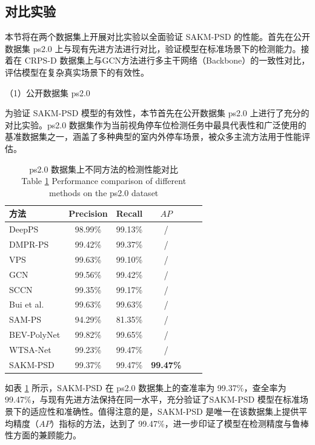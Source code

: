 \subsection{对比实验}

本节将在两个数据集上开展对比实验以全面验证 SAKM-PSD 的性能。首先在公开数据集 ps2.0 上与现有先进方法进行对比，验证模型在标准场景下的检测能力。接着在 CRPS-D 数据集上与GCN\cite{min2021attentional}方法进行多主干网络（Backbone）的一致性对比，评估模型在复杂真实场景下的有效性。

（1）公开数据集 ps2.0

为验证 SAKM-PSD 模型的有效性，本节首先在公开数据集 ps2.0 上进行了充分的对比实验。ps2.0 数据集作为当前视角停车位检测任务中最具代表性和广泛使用的基准数据集之一，涵盖了多种典型的室内外停车场景，被众多主流方法用于性能评估。

\begin{table}[!ht]
\centering
\setlength{\tabcolsep}{8mm}
\caption{ps2.0 数据集上不同方法的检测性能对比 \\ Table \ref{tab_2ps2} Performance comparison of different methods on the ps2.0 dataset}
\begin{tabular}{lccccc}
\toprule
    方法 &  Precision & Recall &  $AP$\\
\midrule
       DeepPS\cite{zhang2018vision}  &  98.99\% & 99.13\% & / \\
       DMPR-PS\cite{huang2019dmpr} &  99.42\% & 99.37\% & / \\
       VPS\cite{li2020vacant}  &  99.63\% & 99.10\% & / \\
       GCN\cite{min2021attentional}  &  99.56\% & 99.42\% & /\\
       SCCN \cite{zheng2022center}  &  99.35\% & 99.17\% & / \\
       Bui et al.\cite{bui2023one} &   99.63\% & 99.63\% & / \\
       SAM-PS\cite{zhai2024sam} &  94.29\% & 81.35\% & / \\
       BEV-PolyNet\cite{duan2025bev}  &  99.82\% & 99.65\% & / \\
       WTSA-Net\cite{li2026parking}  &  99.23\% & 99.47\% & / \\
       SAKM-PSD &   99.37\% & 99.47\% & \textbf{99.47\%}\\
\bottomrule
\end{tabular}
\label{tab_2ps2}
\end{table}

如表 \ref{tab_2ps2} 所示，SAKM-PSD 在 ps2.0 数据集上的查准率为 99.37\%，查全率为 99.47\%，与现有先进方法保持在同一水平，充分验证了SAKM-PSD 模型在标准场景下的适应性和准确性。值得注意的是，SAKM-PSD 是唯一在该数据集上提供平均精度（$AP$）指标的方法，达到了 99.47\%，进一步印证了模型在检测精度与鲁棒性方面的兼顾能力。

